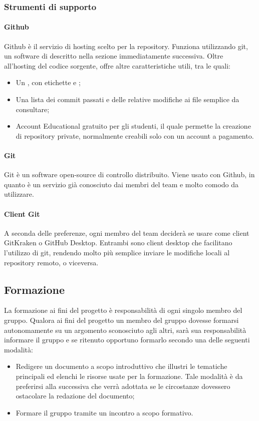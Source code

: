 \subsubsection{Strumenti di supporto}
\paragraph{Github}\Spazio
Github è il servizio di hosting scelto per la repository. Funziona utilizzando git, un software di  descritto nella sezione immediatamente successiva. Oltre all'hosting del codice sorgente, offre altre caratteristiche utili, tra le quali:
\begin{itemize}
\item Un , con etichette e ;
\item Una lista dei commit passati e delle relative modifiche ai file semplice da consultare;
\item Account Educational gratuito per gli studenti, il quale permette la creazione di repository private, normalmente creabili solo con un account a pagamento.
\end{itemize}

\paragraph{Git}\Spazio
Git è un software open-source di controllo  distribuito.
Viene usato con Github, in quanto è un servizio già conosciuto dai membri del team e molto comodo da utilizzare.

\paragraph{Client Git}\Spazio
A seconda delle preferenze, ogni membro del team deciderà se usare come client GitKraken o GitHub Desktop. Entrambi sono client desktop che facilitano l'utilizzo di git, rendendo molto più semplice inviare le modifiche locali al repository remoto, o viceversa.
\subsection{Formazione}
La formazione ai fini del progetto è responsabilità di ogni singolo membro del gruppo. Qualora ai fini del progetto un membro del gruppo dovesse formarsi autonomamente su un argomento sconosciuto agli altri, sarà sua responsabilità informare il gruppo e se ritenuto opportuno formarlo secondo una delle seguenti modalità:
\begin{itemize}
\item Redigere un documento a scopo introduttivo che illustri le tematiche principali ed
elenchi le risorse usate per la formazione. Tale modalità è da preferirsi alla successiva che verrà adottata se le circostanze dovessero ostacolare la redazione del documento;
\item Formare il gruppo tramite un incontro a scopo formativo.
\end{itemize}
\pagebreak
